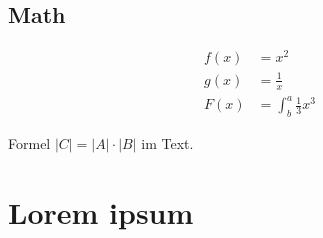 \documentclass[
	floatfix,
	aps,
	pra,
	twocolumn,
  	reprint,
  	superscriptaddress
]{revtex4-2}
\begin{document}
	\subsection{Math}

	
	\begin{align*}
		f(x) &= x^2\\
		g(x) &= \frac{1}{x}\\
		F(x) &= \int^a_b \frac{1}{3}x^3
	\end{align*}
	
	Formel $|C| = |A| \cdot |B|$ im Text.

	\section{Lorem ipsum}
	\blindtext[5]





	
	
\end{document}
